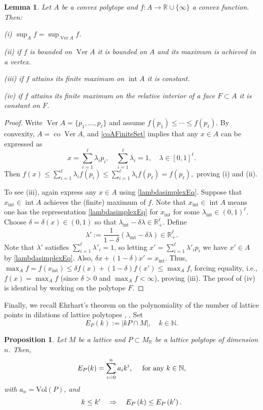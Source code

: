 \documentclass{article}
\newcommand{\Vol}{\mathrm{Vol}}
\newcommand{\NN}{{\mathbb N}}
\newcommand{\RR}{{\mathbb R}}
\renewcommand{\>}{\rightarrow}
\DeclareMathOperator{\Int}{int}
\DeclareMathOperator{\Ver}{Ver}
\DeclareMathOperator{\co}{co}
\theoremstyle{plain}
\newtheorem{proposition}[theorem]{Proposition}
\newtheorem{lemma}[theorem]{Lemma}
\theoremstyle{definition}
\newcommand{\beq}{\begin{equation}}
\newcommand{\eeq}{\end{equation}}
\newcommand{\bpf}{\begin{proof}}
\newcommand{\epf}{\end{proof}}
\newcommand{\blem}{\begin{lemma}}
\newcommand{\elem}{\end{lemma}}
\newcommand{\bprop}{\begin{proposition}}
\newcommand{\eprop}{\end{proposition}}
\def\lb#1{\label{#1}}
\def\ra{\rightarrow}
\def\q{\quad}
\begin{document}
\blem
\lb{ConvMaxAttaindVertexLem}
Let $A$ be a convex polytope and $f:A\ra\RR\cup\{\infty\}$ a convex function.
Then:

\noindent
(i) $\sup_A f=\sup_{\Ver A} f$. 

\noindent
(ii) if $f$ is bounded on $\Ver A$
it is bounded on $A$ and its maximum is achieved in a vertex.

\noindent
(iii) if $f$ attains its finite maximum on $\Int A$ it is constant.

\noindent
(iv) if $f$ attains its finite maximum on the relative interior of a face
$F\subset A$ it is constant on $F$.
\elem
\bpf
Write $\Ver A=\{p_1,\ldots,p_\ell\}$ and assume $f(p_1)\leq\cdots\leq f(p_\ell)$.
By convexity, $A=\co\Ver A$, and \eqref{coAFiniteSet} implies that 
any $x\in A$ can be expressed as 
\beq
\lb{lambdasimplexEq}
        x=\sum_{i=1}^\ell\lambda_ip_i, \q \sum_{i=1}^\ell\lambda_i=1, 
        \q \lambda\in[0,1]^\ell.
\eeq
Then    $
        f\left(x\right)\leq\sum_{i=1}^\ell\lambda_if\left(p_i\right)\leq\sum_{i=1}^\ell\lambda_i 
        f\left(p_\ell\right)=f\left(p_\ell\right),
    $
    proving (i) and (ii).

    To see (iii), again express any $x\in A$ using \eqref{lambdasimplexEq}.
Suppose that $x_{\Int} \in\Int A$ achieves the (finite) maximum of $f$.
    Note that $x_{\Int}\in\Int A$ means one has the representation \eqref{lambdasimplexEq} for $x_{\Int}$ for some  $\lambda_{\Int}\in(0,1)^\ell$.
    Choose $\delta=\delta(x)\in(0,1)$ so that 
    $\lambda_{\Int}-\delta\lambda\in\RR_+^\ell$.
    Define
    $$
        \lambda':=\frac{1}{1-\delta}\left(\lambda_{\Int}-\delta\lambda\right)\in\RR_+^\ell.
    $$
Note that $\lambda'$ satisfies $\sum_{i=1}^{\ell}{\lambda'}_i=1$, so
letting $x'=\sum_{i=1}^{\ell}{\lambda'}_ip_i$ we have $x'\in A$ by \eqref{lambdasimplexEq}.
    Also,
    $
        \delta x+\left(1-\delta\right)x'=
        {x}_{\Int}.
    $
Thus, 
$
\max_Af= f(x_{\Int}) 
\le
        \delta f(x)+\left(1-\delta\right)f(x')
        \le\max_A f$,
        forcing equality, i.e., $f(x)=\max_Af$ (since $\delta>0$
        and $\max_Af<\infty$), proving (iii).
The proof of (iv) is identical by working on the polytope $F$.
\epf

Finally, we recall Ehrhart's theorem on the polynomiality of the number of lattice points
in dilations of lattice polytopes
\cite{Ehr67a,Ehr67b}, \cite[Theorem 19.1]{Gru07}. Set
    \beq
    \lb{EPkEq}
        E_P(k):=|kP\cap M|, \q k\in\NN.
    \eeq

\bprop
\label{Ehrhart polynomial}
    Let $M$ be a lattice and $P\subset M_\RR$ be a lattice polytope of dimension $n$. Then,
    $$
        E_P(k)=\sum_{i=0}^na_ik^i, \q \hbox{ for any $k\in\NN$},
    $$
    with $a_n=\Vol(P)$, and
\beq
\lb{MonotonicityErhardtEq}
\hbox{$k\leq k'$}\q\Rightarrow\q E_P\left(k\right)\leq E_P\left(k'\right).    
\eeq
\eprop
\end{document}
